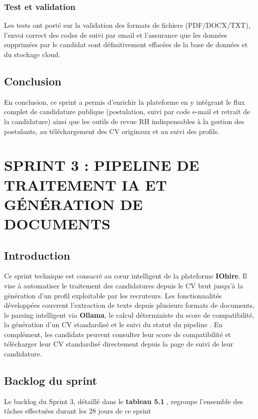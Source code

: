 \documentclass[12pt,a4paper,oneside]{report}
\begin{document}
\begin{itemize}
\subsection{Test et validation}
Les tests ont porté sur la validation des formats de fichiers (PDF/DOCX/TXT), l'envoi correct des codes de suivi par email et l'assurance que les données supprimées par le candidat sont définitivement effacées de la base de données et du stockage cloud.

\section*{Conclusion}
En conclusion, ce sprint a permis d'enrichir la plateforme en y intégrant le flux complet de candidature publique (postulation, suivi par code e-mail et retrait de la candidature) ainsi que les outils de revue RH indispensables à la gestion des postulants, au téléchargement des CV originaux et au suivi des profils.



\chapter{SPRINT 3 : PIPELINE DE TRAITEMENT IA ET GÉNÉRATION DE DOCUMENTS}

\section*{Introduction}
Ce sprint technique est consacré au cœur intelligent de la plateforme \textbf{IOhire}. Il vise à automatiser le traitement des candidatures depuis le CV brut jusqu'à la génération d'un profil exploitable par les recruteurs. Les fonctionnalités développées couvrent l'extraction de texte depuis plusieurs formats de documents, le parsing intelligent via \textbf{Ollama}, le calcul déterministe du score de compatibilité, la génération d'un CV standardisé et le suivi du statut du pipeline .
En complément, les candidats peuvent consulter leur score de compatibilité et télécharger leur CV standardisé directement depuis la page de suivi de leur candidature.

\section{Backlog du sprint}
Le backlog du Sprint 3, détaillé dans le  \textbf{tableau 5.1} , regroupe l'ensemble des tâches effectuées durant les 28 jours de ce sprint


\end{itemize}
\end{document}
